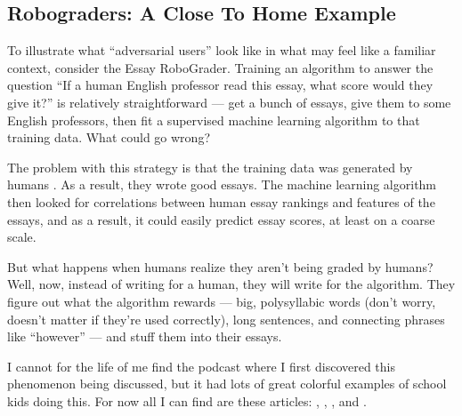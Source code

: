 \documentclass[letterpaper,10pt,english]{jupyterBook}
\begin{document}
\sphinxAtStartPar
{}


\subsection{Robograders: A Close To Home Example}
\label{\detokenize{30_questions/28_passive_external_adversarial_users:robograders-a-close-to-home-example}}
\sphinxAtStartPar
To illustrate what “adversarial users” look like in what may feel like a familiar context, consider the Essay RoboGrader. Training an algorithm to answer the question “If a human English professor read this essay, what score would they give it?” is relatively straightforward — get a bunch of essays, give them to some English professors, then fit a supervised machine learning algorithm to that training data. What could go wrong?

\sphinxAtStartPar
The problem with this strategy is that the training data was generated by humans . As a result, they wrote good essays. The machine learning algorithm then looked for correlations between human essay rankings and features of the essays, and as a result, it could easily predict essay scores, at least on a coarse scale.

\sphinxAtStartPar
But what happens when humans realize they aren’t being graded by humans? Well, now, instead of writing for a human, they will write for the algorithm. They figure out what the algorithm rewards — big, polysyllabic words (don’t worry, doesn’t matter if they’re used correctly), long sentences, and connecting phrases like “however” — and stuff them into their essays.%
\begin{footnote}[1]\sphinxAtStartFootnote
I cannot for the life of me find the podcast where I first discovered this phenomenon being discussed, but it had lots of great colorful examples of school kids doing this. For now all I can find are these articles: , , ,  and .
%
\end{footnote}
\end{document}
